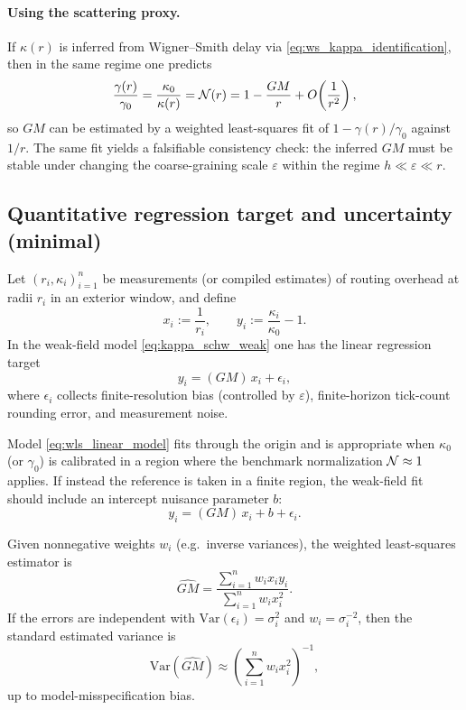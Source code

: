 \paragraph{Using the scattering proxy.}
If $\kappa(r)$ is inferred from Wigner--Smith delay via \eqref{eq:ws_kappa_identification}, then in the same regime one predicts
\begin{equation}
  \frac{\gamma(r)}{\gamma_0}
  = \frac{\kappa_0}{\kappa(r)}
  = \mathcal{N}(r)
  = 1-\frac{GM}{r}+O\!\left(\frac{1}{r^2}\right),
  \label{eq:gamma_schw_weak}
\end{equation}
so $GM$ can be estimated by a weighted least-squares fit of $1-\gamma(r)/\gamma_0$ against $1/r$.
The same fit yields a falsifiable consistency check: the inferred $GM$ must be stable under changing the coarse-graining scale $\varepsilon$ within the regime $h\ll\varepsilon\ll r$.

\subsection{Quantitative regression target and uncertainty (minimal)}
\label{subsec:fit_objective}

Let $(r_i,\kappa_i)_{i=1}^n$ be measurements (or compiled estimates) of routing overhead at radii $r_i$ in an exterior window, and define
\begin{equation}
  x_i := \frac{1}{r_i},
  \qquad
  y_i := \frac{\kappa_i}{\kappa_0}-1.
\end{equation}
In the weak-field model \eqref{eq:kappa_schw_weak} one has the linear regression target
\begin{equation}
  y_i = (GM)\,x_i + \epsilon_i,
  \label{eq:wls_linear_model}
\end{equation}
where $\epsilon_i$ collects finite-resolution bias (controlled by $\varepsilon$), finite-horizon tick-count rounding error, and measurement noise.
\begin{remark}
\label{rem:intercept_fit}
Model \eqref{eq:wls_linear_model} fits through the origin and is appropriate when $\kappa_0$ (or $\gamma_0$) is calibrated in a region where the benchmark normalization $\mathcal{N}\approx 1$ applies.
If instead the reference is taken in a finite region, the weak-field fit should include an intercept nuisance parameter $b$:
\begin{equation}
  y_i = (GM)\,x_i + b + \epsilon_i.
\end{equation}
\end{remark}
Given nonnegative weights $w_i$ (e.g.\ inverse variances), the weighted least-squares estimator is
\begin{equation}
  \widehat{GM}
  = \frac{\sum_{i=1}^n w_i x_i y_i}{\sum_{i=1}^n w_i x_i^2}.
  \label{eq:gm_wls_estimator}
\end{equation}
If the errors are independent with $\mathrm{Var}(\epsilon_i)=\sigma_i^2$ and $w_i=\sigma_i^{-2}$, then the standard estimated variance is
\begin{equation}
  \mathrm{Var}(\widehat{GM}) \approx \left(\sum_{i=1}^n w_i x_i^2\right)^{-1},
  \label{eq:gm_wls_var}
\end{equation}
up to model-misspecification bias.

